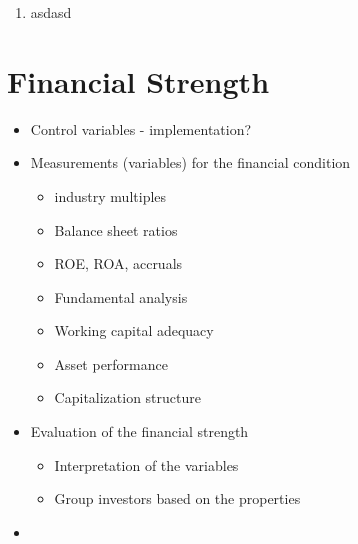 \documentclass[12pt]{article}
\begin{document}
\begin{enumerate}
\begin{enumerate}
    \end{enumerate}
    
    \item asdasd

\end{enumerate}


\section{Financial Strength}

    \begin{itemize}
    \item Control variables - implementation?

    \item Measurements (variables) for the financial condition 

        \begin{itemize}
        \item industry multiples
        \item Balance sheet ratios
        \item ROE, ROA, accruals 
        \item Fundamental analysis
        \item Working capital adequacy
        \item Asset performance
        \item Capitalization structure
        \end{itemize}

    \item Evaluation of the financial strength

        \begin{itemize}
        \item Interpretation of the variables
        \item Group investors based on the properties
        \end{itemize}

    \item 
    \end{itemize}
\end{document}
